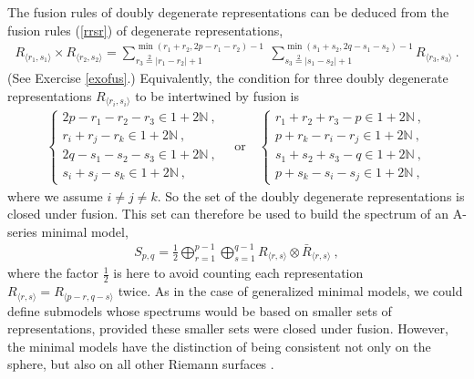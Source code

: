 \documentclass[12pt,a4paper,notitlepage]{report}
\newcommand \bla {\left\{\begin{array}{l} }
\newcommand \ela {\end{array}\right. }
\newcommand \N {\mathbb{N}}
\numberwithin{equation}{section}
\theoremstyle{break}
\begin{document}
The fusion rules of doubly degenerate representations can be deduced from the fusion rules (\ref{rrsr}) of degenerate representations, 
\begin{align}
  \boxed{R_{\langle r_1,s_1 \rangle} \times R_{\langle r_2,s_2 \rangle} = \sum_{r_3\overset{2}{=}|r_1-r_2|+1}^{\min(r_1+r_2,2p-r_1-r_2)-1}\ \sum_{s_3\overset{2}{=}|s_1-s_2|+1}^{\min(s_1+s_2,2q-s_1-s_2)-1} R_{\langle r_3,s_3 \rangle}}\ .
\label{rrmm}
\end{align}
(See Exercise \ref{exofus}.) Equivalently, 
the condition for three doubly degenerate representations $R_{\langle r_i,s_i \rangle}$ to be intertwined by fusion is 
\begin{align}
 \bla 2p-r_1-r_2-r_3\in 1+2\N\ , \\
 r_i+r_j-r_k \in 1 + 2\N\ , \\
2q-s_1-s_2-s_3\in 1+2\N\ , \\
 s_i+s_j-s_k \in 1 + 2\N\ , \ela 
\quad \text{or} \quad
 \bla r_1+r_2+r_3-p\in 1+2\N\ , \\
 p+r_k-r_i-r_j\in 1+2\N \ , \\
s_1+s_2+s_3-q\in 1+2\N\ , \\
 p+s_k-s_i-s_j\in 1+2\N \ ,\ela
\end{align}
where we assume $i\neq j\neq k$.
So the set of the doubly degenerate representations is closed under fusion. This set can therefore be used to build the spectrum of an A-series minimal model,
\begin{align}
 \boxed{ S_{p,q} = \frac12 \bigoplus_{r=1}^{p-1} \bigoplus_{s=1}^{q-1} R_{\langle r,s \rangle}\otimes \bar{R}_{\langle r,s \rangle} } \ ,
\label{smin}
\end{align}
where the factor $\frac12$ is here to avoid counting each representation $R_{\langle r,s \rangle}=R_{\langle p-r,q-s \rangle}$ twice. As in the case of generalized minimal models, we could define submodels whose spectrums would be based on smaller sets of representations, provided these smaller sets were closed under fusion. However, the minimal models have the distinction of being consistent not only on the sphere, but also on all other Riemann surfaces \cite{fms97}.
\end{document}
